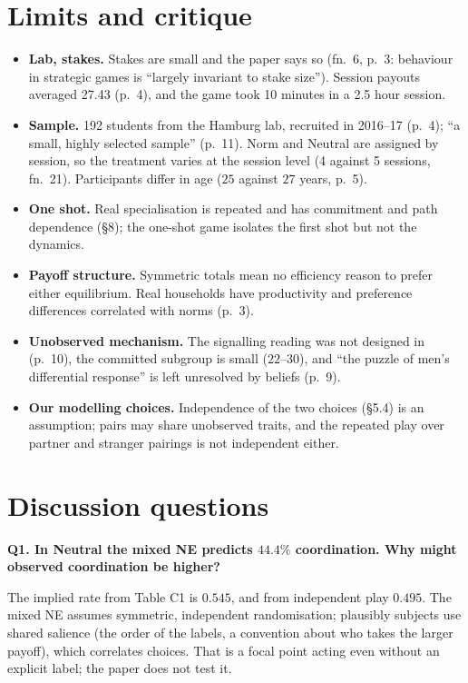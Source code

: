 \documentclass[11pt,a4paper]{article}
\newcommand{\answer}[1]{\begin{tcolorbox}[colback=ans!5,colframe=ans,boxrule=0.6pt,
  left=5pt,right=5pt,top=3pt,bottom=3pt]#1\end{tcolorbox}}
\begin{document}
\section{Limits and critique}

\begin{itemize}
  \item \textbf{Lab, stakes.} Stakes are small and the paper says so (fn.~6, p.~3: behaviour in
    strategic games is ``largely invariant to stake size''). Session payouts averaged
    \texteuro{}27.43 (p.~4), and the game took 10 minutes in a 2.5 hour session.
  \item \textbf{Sample.} 192 students from the Hamburg lab, recruited in 2016--17 (p.~4);
    ``a small, highly selected sample'' (p.~11). Norm and Neutral are assigned by session, so
    the treatment varies at the session level (4 against 5 sessions, fn.~21). Participants differ in
    age ($25$ against $27$ years, p.~5).
  \item \textbf{One shot.} Real specialisation is repeated and has commitment and path
    dependence (\S8); the one-shot game isolates the first shot but not the dynamics.
  \item \textbf{Payoff structure.} Symmetric totals mean no efficiency reason to prefer either
    equilibrium. Real households have productivity and preference differences correlated with norms
    (p.~3).
  \item \textbf{Unobserved mechanism.} The signalling reading was not designed in (p.~10), the
    committed subgroup is small ($22$--$30$), and ``the puzzle of men's differential response'' is left unresolved by beliefs (p.~9).
  \item \textbf{Our modelling choices.} Independence of the two choices (\S5.4) is an assumption;
    pairs may share unobserved traits, and the repeated play over partner and stranger pairings is
    not independent either.
\end{itemize}

\section{Discussion questions}

\textbf{Q1. In Neutral the mixed NE predicts $44.4\%$ coordination. Why might observed coordination
be higher?}
\answer{The implied rate from Table C1 is $0.545$, and from independent play $0.495$. The mixed NE
assumes symmetric, independent randomisation; plausibly subjects use shared salience (the
order of the labels, a convention about who takes the larger payoff), which correlates choices.
That is a focal point acting even without an explicit label; the paper does not test it.}
\end{document}
